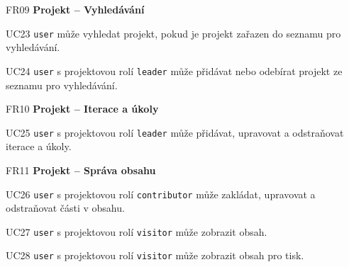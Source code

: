 \begin{dlnar}
   \item[FR09] \textbf{Projekt -- Vyhledávání}
   
   \begin{dlnar}
      \item[UC23] 
      \texttt{user} může vyhledat projekt, pokud je projekt zařazen do seznamu pro vyhledávání.

      \item[UC24]
      \texttt{user} s projektovou rolí \texttt{leader} může přidávat nebo odebírat projekt ze seznamu pro vyhledávání.
   \end{dlnar}
\end{dlnar}


\begin{dlnar}
   \item[FR10] \textbf{Projekt -- Iterace a úkoly}
   
   \begin{dlnar}
      \item[UC25] 
      \texttt{user} s projektovou rolí \texttt{leader} může přidávat, upravovat a odstraňovat iterace a úkoly.
   \end{dlnar}
\end{dlnar}


\begin{dlnar}
   \item[FR11] \textbf{Projekt -- Správa obsahu}
 
   \begin{dlnar}
      \item[UC26] 
      \texttt{user} s projektovou rolí \texttt{contributor} může zakládat, upravovat a odstraňovat části v obsahu. 

      \item[UC27] 
      \texttt{user} s projektovou rolí \texttt{visitor} může zobrazit obsah.

      \item[UC28] 
      \texttt{user} s projektovou rolí \texttt{visitor} může zobrazit obsah pro tisk.
   \end{dlnar}
\end{dlnar}


